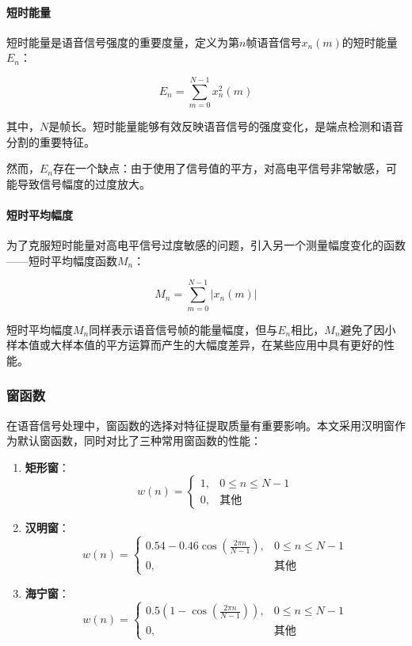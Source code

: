 \documentclass[sigconf,nonacm]{acmart}
\begin{document}
\paragraph{短时能量}

短时能量是语音信号强度的重要度量，定义为第$n$帧语音信号$x_n(m)$的短时能量$E_n$：

\begin{equation}
E_n = \sum_{m=0}^{N-1} x_n^2(m)
\end{equation}

其中，$N$是帧长。短时能量能够有效反映语音信号的强度变化，是端点检测和语音分割的重要特征。

然而，$E_n$存在一个缺点：由于使用了信号值的平方，对高电平信号非常敏感，可能导致信号幅度的过度放大。

\paragraph{短时平均幅度}

为了克服短时能量对高电平信号过度敏感的问题，引入另一个测量幅度变化的函数——短时平均幅度函数$M_n$：

\begin{equation}
M_n = \sum_{m=0}^{N-1} |x_n(m)|
\end{equation}

短时平均幅度$M_n$同样表示语音信号帧的能量幅度，但与$E_n$相比，$M_n$避免了因小样本值或大样本值的平方运算而产生的大幅度差异，在某些应用中具有更好的性能。

\subsubsection{窗函数}

在语音信号处理中，窗函数的选择对特征提取质量有重要影响。本文采用汉明窗作为默认窗函数，同时对比了三种常用窗函数的性能：

\begin{enumerate}
\item \textbf{矩形窗}：
\begin{equation}
w(n) = \begin{cases}
1, & 0 \leq n \leq N-1 \\
0, & \text{其他}
\end{cases}
\end{equation}

\item \textbf{汉明窗}：
\begin{equation}
w(n) = \begin{cases}
0.54 - 0.46\cos\left(\frac{2\pi n}{N-1}\right), & 0 \leq n \leq N-1 \\
0, & \text{其他}
\end{cases}
\end{equation}

\item \textbf{海宁窗}：
\begin{equation}
w(n) = \begin{cases}
0.5\left(1 - \cos\left(\frac{2\pi n}{N-1}\right)\right), & 0 \leq n \leq N-1 \\
0, & \text{其他}
\end{cases}
\end{equation}
\end{enumerate}
\end{document}
